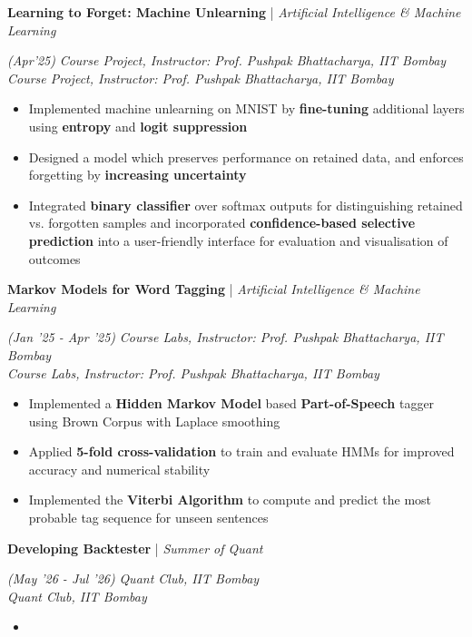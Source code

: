 \documentclass[10pt]{article}
\renewcommand{\subsection}[4]{
	\def\temp{#4}
	\vspace{2pt}
	{
		\large
		{\color{Green} \textbf{#1}} | {\sl #2} \filldate{#3}
		\ifx\temp\empty
		\else
		{
			\\[0.098em]
			\fontsize{10.5}{13.2}\selectfont
			\sl #4
		}
		\fi
	}
}
\newcommand{\filldate}[1]{\strut\hfill {\small \textit{(#1)}}}
\begin{document}
\subsection{Learning to Forget: Machine Unlearning}{Artificial Intelligence \& Machine Learning}{Apr'25}{\textit{Course Project, Instructor: Prof. Pushpak Bhattacharya, IIT Bombay}}
\begin{itemize}
    \item Implemented machine unlearning on MNIST by \textbf{fine-tuning} additional layers using \textbf{entropy} and \textbf{logit suppression}
    \item Designed a model which preserves performance on retained data, and enforces forgetting by \textbf{increasing uncertainty}
    \item Integrated \textbf{binary classifier} over softmax outputs for distinguishing retained vs. forgotten samples and incorporated \textbf{confidence-based selective prediction} into a user-friendly interface for evaluation and visualisation of outcomes
\end{itemize}

\vspace{-13px}

\subsection{Markov Models for Word Tagging}{Artificial Intelligence \& Machine Learning}{Jan '25 - Apr '25}{\textit{Course Labs, Instructor: Prof. Pushpak Bhattacharya, IIT Bombay}}
\begin{itemize}
    \item Implemented a \textbf{Hidden Markov Model} based \textbf{Part-of-Speech} tagger using Brown Corpus with Laplace smoothing
    \item Applied \textbf{5-fold cross-validation} to train and evaluate HMMs for improved accuracy and numerical stability
    \item Implemented the \textbf{Viterbi Algorithm} to compute and predict the most probable tag sequence for unseen sentences
\end{itemize}

\vspace{-13px}

\subsection{Developing Backtester}{Summer of Quant}{May '26 - Jul '26}{\textit{Quant Club, IIT Bombay}}
\begin{itemize}
    \item 
\end{itemize}
\end{document}
